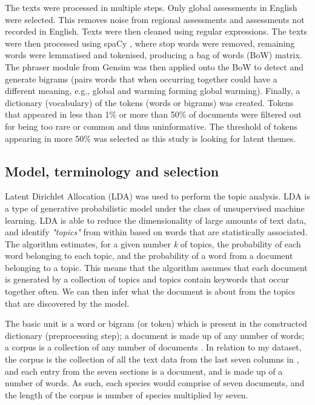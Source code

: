 The texts were processed in multiple steps. Only global assessments in English were selected. This removes noise from regional assessments and assessments not recorded in English. Texts were then cleaned using regular expressions. The texts were then processed using spaCy \parencite{spacy}, where stop words were removed, remaining words were lemmatised and tokenised, producing a bag of words (BoW) matrix. The phraser module from Gensim \parencite{rehurek_lrec} was then applied onto the BoW to detect and generate bigrams (pairs words that when occurring together could have a different meaning, e.g., global and warming forming global warming). Finally, a dictionary (vocabulary) of the tokens (words or bigrams) was created. Tokens that appeared in less than 1\% or more than 50\% of documents were filtered out for being too rare or common and thus uninformative. The threshold of tokens appearing in more 50\% was selected as this study is looking for latent themes.

\subsection{Model, terminology and selection}

Latent Dirichlet Allocation (LDA) \parencite{blei2003latent} was used to perform the topic analysis. LDA is a type of generative probabilistic model under the class of unsupervised machine learning. LDA is able to reduce the dimensionality of large amounts of text data, and identify \textit{"topics"} from within based on words that are statistically associated. The algorithm estimates, for a given number \textit{k} of topics, the probability of each word belonging to each topic, and the probability of a word from a document belonging to a topic. This means that the algorithm assumes that each document is generated by a collection of topics and topics contain keywords that occur together often. We can then infer what the document is about from the topics that are discovered by the model.

The basic unit is a word or bigram (or token) which is present in the constructed dictionary (preprocessing step); a document is made up of any number of words; a corpus is a collection of any number of documents \parencite{blei2003latent}. In relation to my dataset, the corpus is the collection of all the text data from the last seven columns in , and each entry from the seven sections is a document, and is made up of a number of words. As such, each species would comprise of seven documents, and the length of the corpus is number of species multiplied by seven.

